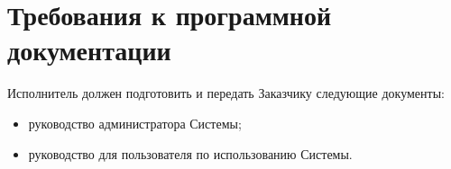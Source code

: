 \documentclass{bmstu-gost-7-32}
\begin{document}





\section{Требования к программной документации}



Исполнитель должен подготовить и передать Заказчику следующие документы:
\begin{itemize}
	\item руководство администратора Системы;
	\item руководство для пользователя по использованию Системы.
\end{itemize}
\end{document}
